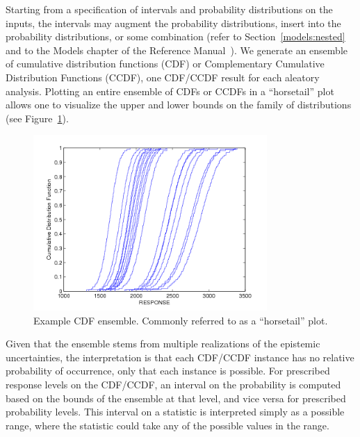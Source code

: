 Starting from a specification of intervals and probability distributions 
on the inputs, %
the intervals may augment the probability distributions, insert into
the probability distributions, or some combination (refer to 
Section~\ref{models:nested} and to the Models chapter of the Reference 
Manual~\cite{RefMan}). We generate an
ensemble of cumulative distribution functions (CDF) or Complementary
Cumulative Distribution Functions (CCDF), one CDF/CCDF result for each
aleatory analysis. Plotting an entire ensemble of CDFs or CCDFs in a 
``horsetail'' plot allows one to visualize the upper and lower bounds 
on the family of distributions (see Figure~\ref{fig:horsetail}).
\begin{figure}[h!]%
 \begin{center}
 \includegraphics[width = 3.5in]{images/horsetail}
 \caption{Example CDF ensemble. Commonly referred to as a ``horsetail'' plot.}
 \label{fig:horsetail}
 \end{center} 
\end{figure}
Given that the ensemble stems from multiple
realizations of the epistemic uncertainties, the interpretation is
that each CDF/CCDF instance has no relative probability of occurrence,
only that each instance is possible. For prescribed response levels
on the CDF/CCDF, an interval on the probability is computed based on
the bounds of the ensemble at that level, and vice versa for
prescribed probability levels. This interval on a statistic is
interpreted simply as a possible range, where the statistic could take
any of the possible values in the range.

